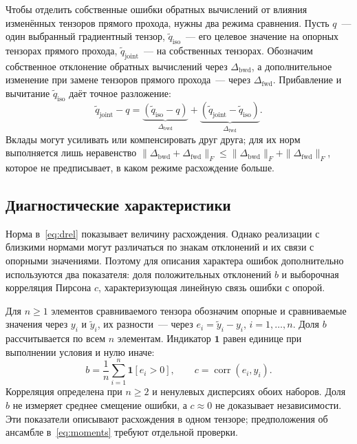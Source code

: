 Чтобы отделить собственные ошибки обратных вычислений от влияния
изменённых тензоров прямого прохода, нужны два режима сравнения.
Пусть $q$~--- один выбранный градиентный тензор,
$\widetilde q_{\mathrm{iso}}$~--- его целевое значение на опорных тензорах
прямого прохода, $\widetilde q_{\mathrm{joint}}$~--- на собственных тензорах.
Обозначим собственное отклонение обратных вычислений через
$\Delta_{\mathrm{bwd}}$, а дополнительное изменение при замене тензоров
прямого прохода~--- через $\Delta_{\mathrm{fwd}}$.
Прибавление и вычитание $\widetilde q_{\mathrm{iso}}$ даёт точное разложение:
\begin{equation}
    \label{eq:grad-decomp}
    \widetilde q_{\mathrm{joint}}-q
    =\underbrace{(\widetilde q_{\mathrm{iso}}-q)}_{\Delta_{\mathrm{bwd}}}
    +\underbrace{(\widetilde q_{\mathrm{joint}}-\widetilde q_{\mathrm{iso}})}
        _{\Delta_{\mathrm{fwd}}}.
\end{equation}
Вклады могут усиливать или компенсировать друг друга;
для их норм выполняется лишь неравенство
$\|\Delta_{\mathrm{bwd}}+\Delta_{\mathrm{fwd}}\|_F
\le\|\Delta_{\mathrm{bwd}}\|_F+\|\Delta_{\mathrm{fwd}}\|_F$,
которое не предписывает, в каком режиме расхождение больше.

\subsection{Диагностические характеристики}

Норма в~\eqref{eq:drel} показывает величину расхождения.
Однако реализации с близкими нормами могут различаться по знакам
отклонений и их связи с опорными значениями. Поэтому для описания
характера ошибок дополнительно используются два показателя:
доля положительных отклонений $b$ и выборочная корреляция Пирсона $c$,
характеризующая линейную связь ошибки с опорой.

Для $n\ge1$ элементов сравниваемого тензора обозначим опорные
и сравниваемые значения через $y_i$ и $\widetilde y_i$,
их разности~--- через $e_i=\widetilde y_i-y_i$, $i=1,\ldots,n$.
Доля $b$ рассчитывается по всем $n$ элементам.
Индикатор $\mathbf{1}$ равен единице при выполнении условия и нулю иначе:
\begin{equation}
    \label{eq:diag}
    b=\frac1n\sum_{i=1}^{n}\mathbf{1}[e_i>0],\qquad
    c=\operatorname{corr}(e_i,y_i).
\end{equation}
Корреляция определена при $n\ge2$ и ненулевых дисперсиях обоих наборов.
Доля $b$ не измеряет среднее смещение ошибки, а $c\approx0$ не доказывает
независимости. Эти показатели описывают расхождения в одном тензоре;
предположения об ансамбле в~\eqref{eq:moments} требуют отдельной проверки.
